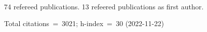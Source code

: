 74 refereed publications. 13 refeered publications as first author.

Total citations~=~3021; h-index~=~30 (2022-11-22)